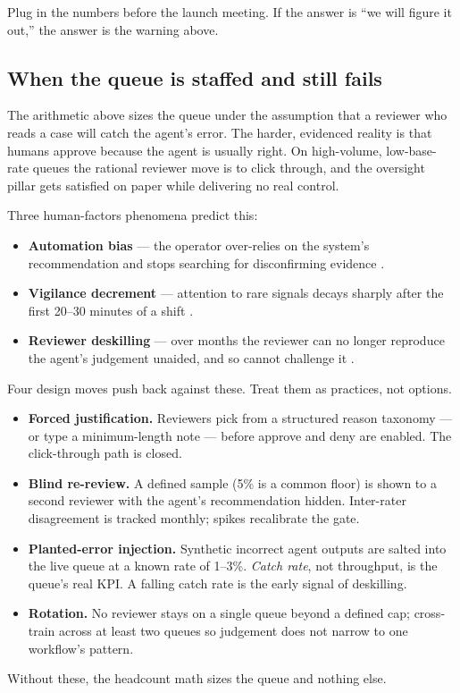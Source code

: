 Plug in the numbers before the launch meeting. If the answer is ``we will figure it out,'' the answer is the warning above.

\begin{TNnew}
\subsection*{When the queue is staffed and still fails}

The arithmetic above sizes the queue under the assumption that a reviewer who reads a case will catch the agent's error. The harder, evidenced reality is that humans approve because the agent is usually right. On high-volume, low-base-rate queues the rational reviewer move is to click through, and the oversight pillar gets satisfied on paper while delivering no real control.

Three human-factors phenomena predict this:

\begin{itemize}
\item \textbf{Automation bias} --- the operator over-relies on the system's recommendation and stops searching for disconfirming evidence \citep{parasuraman-manzey-2010}.
\item \textbf{Vigilance decrement} --- attention to rare signals decays sharply after the first 20--30 minutes of a shift \citep{warm-parasuraman-matthews-2008}.
\item \textbf{Reviewer deskilling} --- over months the reviewer can no longer reproduce the agent's judgement unaided, and so cannot challenge it \citep{bainbridge-1983}.
\end{itemize}

Four design moves push back against these. Treat them as practices, not options.

\begin{itemize}
\item \textbf{Forced justification.} Reviewers pick from a structured reason taxonomy --- or type a minimum-length note --- before approve and deny are enabled. The click-through path is closed.
\item \textbf{Blind re-review.} A defined sample (5\% is a common floor) is shown to a second reviewer with the agent's recommendation hidden. Inter-rater disagreement is tracked monthly; spikes recalibrate the gate.
\item \textbf{Planted-error injection.} Synthetic incorrect agent outputs are salted into the live queue at a known rate of 1--3\%. \textit{Catch rate}, not throughput, is the queue's real KPI. A falling catch rate is the early signal of deskilling.
\item \textbf{Rotation.} No reviewer stays on a single queue beyond a defined cap; cross-train across at least two queues so judgement does not narrow to one workflow's pattern.
\end{itemize}

Without these, the headcount math sizes the queue and nothing else.
\end{TNnew}

